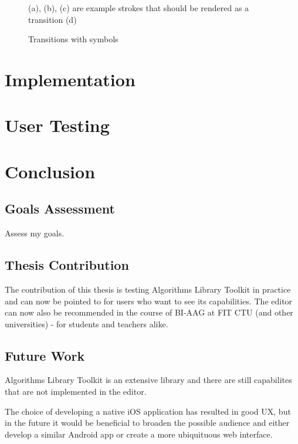 \begin{figure}
    \centering
    \caption{(a), (b), (c) are example strokes that should be rendered as a transition (d)}\label{transition}
\end{figure}

\begin{figure}
    \centering
    \caption{Transitions with symbols}\label{transition-symbols}
\end{figure}

\chapter{Implementation}
\label{chap:implementation}

\chapter{User Testing}

\chapter{Conclusion}

\section{Goals Assessment}

Assess my goals.

\section{Thesis Contribution}

The contribution of this thesis is testing Algorithms Library Toolkit in practice and can now be pointed to for users who want to see its capabilities. The editor can now also be recommended in the course of BI-AAG at FIT CTU (and other universities) - for students and teachers alike.

\section{Future Work}

Algorithms Library Toolkit is an extensive library and there are still capabilites that are not implemented in the editor.

The choice of developing a native iOS application has resulted in good UX, but in the future it would be beneficial to broaden the possible audience and either develop a similar Android app or create a more ubiquituous web interface.
